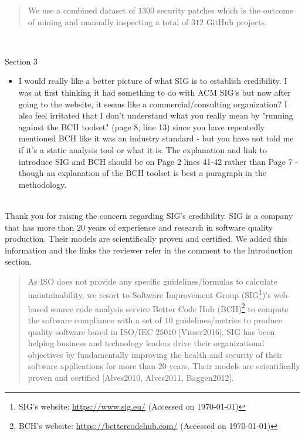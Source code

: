 \documentclass[11pt,fleqn]{article}
\newcommand{\eline}{\vspace*{.75\baselineskip}}
\newcommand{\Referee}[1]{\eline \noindent {\bf Reviewer comment #1:} \\}
\newcommand{\Us}{\eline \noindent {\bf Response:}\\}
\newenvironment{revcomment}[1][]
{\Referee{#1}\begin{rcomment}}
{\end{rcomment}}
\begin{document}
\begin{quote}
    We use a combined dataset of $1300$ security patches which is 
the outcome of mining and manually inspecting a total of $312$ 
GitHub projects.
\end{quote}

\begin{revcomment}[2.7]
    Section 3\\
    \begin{itemize}
        \item I would really like a better picture of what SIG is to establish credibility.  I was at first 
        thinking it had something to do with ACM SIG's but now after going to the website, it seems like a 
        commercial/consulting organization? I also feel irritated that I don't understand what you really mean 
        by "running against the BCH toolset" (page 8, line 13) since you have repeatedly mentioned BCH like it was 
        an industry standard - but you have not told me if it's a static analysis tool or what it is.  The explanation 
        and link to introduce SIG and BCH should be on Page 2 lines 41-42 rather than Page 7 - though an explanation 
        of the BCH toolset is best a paragraph in the methodology.  
    \end{itemize}
\end{revcomment}

\Us Thank you for raising the concern regarding SIG's credibility. SIG is a company that 
has more than $20$ years of experience and research in software quality production. 
Their models are scientifically proven and certified. We added this information and 
the links the reviewer refer in the comment to the Introduction section.

\begin{quote}
    As ISO does not provide any specific guidelines/formulas to 
calculate maintainability, we resort to Software Improvement Group 
(SIG\footnote{SIG's website: 
\url{https://www.sig.eu/} (Accessed on \today{})})'s web-based source 
code analysis service Better Code Hub (BCH)\footnote{BCH's 
website: \url{https://bettercodehub.com/} (Accessed on \today{})}  
to compute the software compliance with a set of $10$ 
guidelines/metrics to produce quality software based in ISO/IEC 
$25010$ [Visser2016]. SIG 
has been helping business and technology leaders drive their organizational 
objectives by fundamentally improving the health and security of 
their software applications for more than 20 years. Their 
models are scientifically proven and certified [Alves2010, Alves2011, Baggen2012].
\end{quote}
\end{document}
